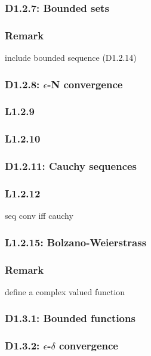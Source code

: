 \documentclass{article}
\begin{document}
\begin{multicols*}{3}
\subsubsection*{D1.2.7: Bounded sets}

\subsubsection*{Remark}
include bounded sequence (D1.2.14)

\subsubsection*{D1.2.8: $\epsilon$-N convergence}

\subsubsection*{L1.2.9}

\subsubsection*{L1.2.10}

\subsubsection*{D1.2.11: Cauchy sequences}

\subsubsection*{L1.2.12}
seq conv iff cauchy

\subsubsection*{L1.2.15: Bolzano-Weierstrass}

\newcolumn

\subsubsection*{Remark}
define a complex valued function

\subsubsection*{D1.3.1: Bounded functions}

\subsubsection*{D1.3.2: $\epsilon$-$\delta$ convergence}


\end{multicols*}
\end{document}
